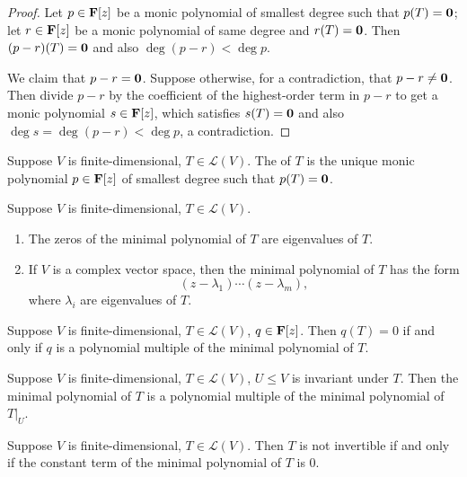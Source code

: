 \begin{proof}
 Let $p\in\mathbf F[z]$ be a monic polynomial of smallest degree such that $p(T)=\vb{0}$; let $r\in\mathbf F[z]$ be a monic polynomial of same degree and $r(T)=\vb{0}$. Then $(p-r)(T)=\vb{0}$ and also $\deg(p-r)<\deg p$.

We claim that $p-r=\vb{0}$. Suppose otherwise, for a contradiction, that $p-r\neq\vb{0}$. Then divide $p-r$ by the coefficient of the highest-order term in $p-r$ to get a monic polynomial $s\in\mathbf F[z]$, which satisfies $s(T)=\vb{0}$ and also $\deg s=\deg(p-r)<\deg p$, a contradiction.
\end{proof}

\begin{definition}
Suppose $V$ is finite-dimensional, $T\in\mathcal{L}(V)$. The  of $T$ is the unique monic polynomial $p\in\mathbf F[z]$ of smallest degree such that $p(T)=\vb{0}$.
\end{definition}

\begin{theorem}
Suppose $V$ is finite-dimensional, $T\in\mathcal{L}(V)$.
\begin{enumerate}[label=(\roman*)]
\item The zeros of the minimal polynomial of $T$ are eigenvalues of $T$.
\item If $V$ is a complex vector space, then the minimal polynomial of $T$ has the form
\[(z-\lambda_1)\cdots(z-\lambda_m),\]
where $\lambda_i$ are eigenvalues of $T$.
\end{enumerate}
\end{theorem}

\begin{proposition}
Suppose $V$ is finite-dimensional, $T\in\mathcal{L}(V)$, $q\in\mathbf F[z]$. Then $q(T)=0$ if and only if $q$ is a polynomial multiple of the minimal polynomial of $T$.
\end{proposition}

\begin{proposition}
Suppose $V$ is finite-dimensional, $T\in\mathcal{L}(V)$, $U\le V$ is invariant under $T$. Then the minimal polynomial of $T$ is a polynomial multiple of the minimal polynomial of $T|_U$.
\end{proposition}

\begin{corollary}
Suppose $V$ is finite-dimensional, $T\in\mathcal{L}(V)$. Then $T$ is not invertible if and only if the constant term of the minimal polynomial of $T$ is $0$.
\end{corollary}

